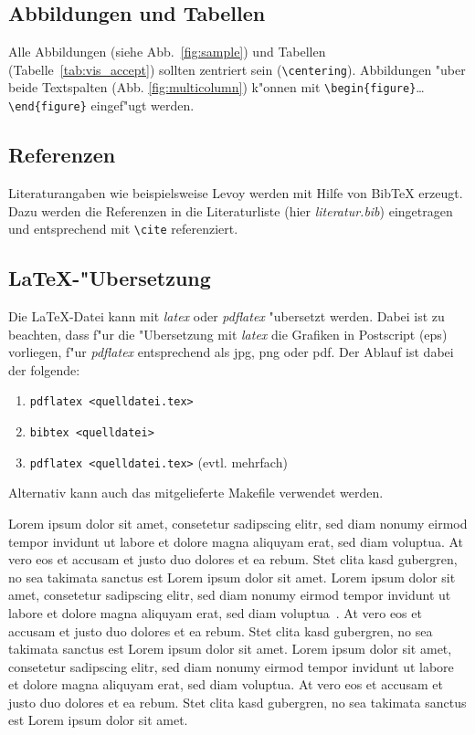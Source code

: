 \documentclass[journal]{vgtc}
\begin{document}
\subsection{Abbildungen und Tabellen}

Alle Abbildungen (siehe Abb.\ \ref{fig:sample}) und Tabellen (Tabelle\
\ref{tab:vis_accept}) sollten zentriert sein
(\verb|\centering|). Abbildungen "uber beide Textspalten
(Abb. \ref{fig:multicolumn}) k"onnen mit
\verb|\begin{figure}|\ldots\verb|\end{figure}| eingef"ugt werden.

\subsection{Referenzen}

Literaturangaben wie beispielsweise Levoy \cite{levoy:1989:DSV} werden
mit Hilfe von BibTeX erzeugt. Dazu werden die Referenzen in die
Literaturliste (hier \emph{literatur.bib}) eingetragen und
entsprechend mit \verb|\cite| referenziert.

\subsection{\LaTeX-"Ubersetzung}

Die \LaTeX-Datei kann mit \emph{latex} oder \emph{pdflatex} "ubersetzt
werden. Dabei ist zu beachten, dass f"ur die "Ubersetzung mit
\emph{latex} die Grafiken in Postscript (eps) vorliegen, f"ur
\emph{pdflatex} entsprechend als jpg, png oder pdf.  Der Ablauf ist
dabei der folgende:
\begin{enumerate}
\item \verb|pdflatex <quelldatei.tex>|
\item \verb|bibtex <quelldatei>|
\item \verb|pdflatex <quelldatei.tex>| (evtl. mehrfach)
\end{enumerate}
Alternativ kann auch das mitgelieferte Makefile verwendet werden.





Lorem ipsum dolor sit amet, consetetur sadipscing elitr, sed diam
nonumy eirmod tempor invidunt ut labore et dolore magna aliquyam erat,
sed diam voluptua. At vero eos et accusam et justo duo dolores et ea
rebum. Stet clita kasd gubergren, no sea takimata sanctus est Lorem
ipsum dolor sit amet. Lorem ipsum dolor sit amet, consetetur
sadipscing elitr, sed diam nonumy eirmod tempor invidunt ut labore et
dolore magna aliquyam erat, sed diam
voluptua~\cite{kitware2003,Max:1995:OMF}. At vero eos et accusam et
justo duo dolores et ea rebum. Stet clita kasd gubergren, no sea
takimata sanctus est Lorem ipsum dolor sit amet. Lorem ipsum dolor sit
amet, consetetur sadipscing elitr, sed diam nonumy eirmod tempor
invidunt ut labore et dolore magna aliquyam erat, sed diam
voluptua. At vero eos et accusam et justo duo dolores et ea
rebum. Stet clita kasd gubergren, no sea takimata sanctus est Lorem
ipsum dolor sit amet.
\end{document}
